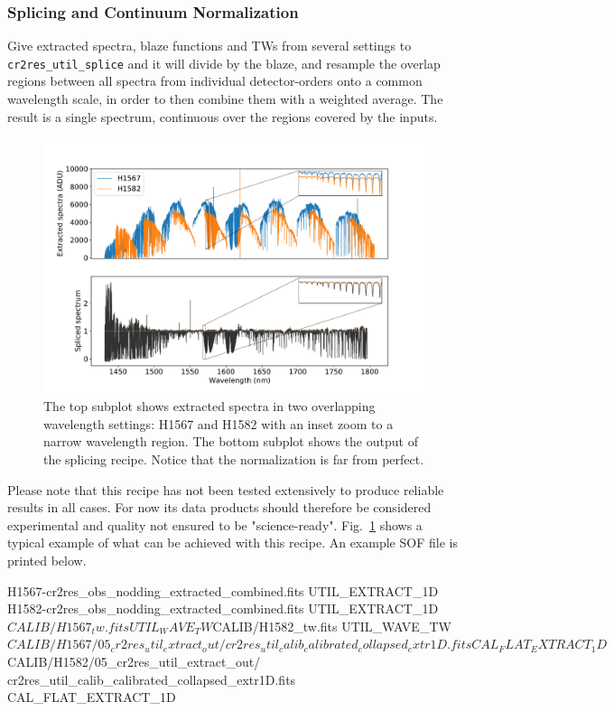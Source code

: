 \subsubsection{Splicing and Continuum Normalization}

Give extracted spectra, blaze functions and TWs from several settings to
\texttt{cr2res\_util\_splice} and it will divide by the blaze, and resample the
overlap regions between all spectra from individual detector-orders onto a
common wavelength scale, in order to then combine them with a weighted average.
The result is a single spectrum, continuous over the regions covered by the
inputs.

\begin{figure}[!h]
  \begin{center}
    \includegraphics[width=1\textwidth]{figures/util_splice}
  \end{center}
  \caption{
    \label{fig:util_splice}
    The top subplot shows extracted spectra in two overlapping
    wavelength settings: H1567 and H1582 with an inset zoom to a narrow
    wavelength region. The bottom subplot shows the output of the splicing
    recipe. Notice that the normalization is far from perfect.}
\end{figure}

Please note that this recipe has not been tested extensively to produce reliable
results in all cases. For now its data products should therefore be considered
experimental and quality not ensured to be "science-ready". Fig.~\ref{fig:util_splice}
shows a typical example of what can be achieved with this recipe. An example SOF
file is printed below.

\begin{shell}[fontsize=\small]
H1567-cr2res_obs_nodding_extracted_combined.fits UTIL_EXTRACT_1D
H1582-cr2res_obs_nodding_extracted_combined.fits UTIL_EXTRACT_1D
$CALIB/H1567_tw.fits UTIL_WAVE_TW
$CALIB/H1582_tw.fits UTIL_WAVE_TW
$CALIB/H1567/05_cr2res_util_extract_out/
  cr2res_util_calib_calibrated_collapsed_extr1D.fits CAL_FLAT_EXTRACT_1D
$CALIB/H1582/05_cr2res_util_extract_out/
  cr2res_util_calib_calibrated_collapsed_extr1D.fits CAL_FLAT_EXTRACT_1D
\end{shell}

